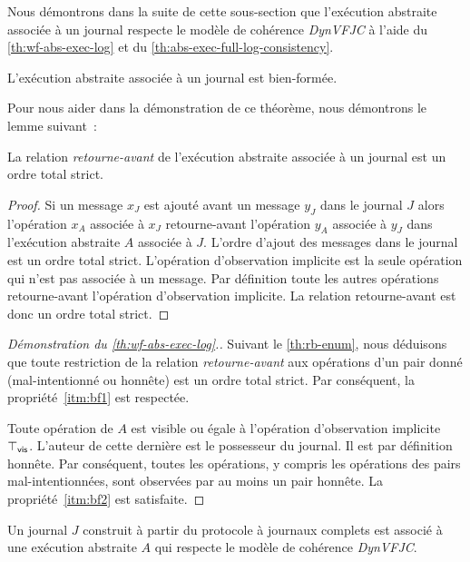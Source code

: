 Nous démontrons dans la suite de cette sous-section que l'exécution abstraite associée à un journal respecte le modèle de cohérence \emph{DynVFJC} à l'aide du \autoref{th:wf-abs-exec-log} et du \autoref{th:abs-exec-full-log-consistency}.

\begin{theorem}\label{th:wf-abs-exec-log}
L'exécution abstraite associée à un journal est bien-formée.
\end{theorem}

Pour nous aider dans la démonstration de ce théorème, nous démontrons le lemme suivant~:

\begin{lemma}\label{th:rb-enum}
La relation \emph{retourne-avant} de l'exécution abstraite associée à un journal est un ordre total strict.
\end{lemma}
\begin{proof}
Si un message $x_J$ est ajouté avant un message $y_J$ dans le journal $J$ alors l'opération $x_A$ associée à $x_J$ retourne-avant l'opération $y_A$ associée à $y_J$ dans l'exécution abstraite $A$ associée à $J$.
L'ordre d'ajout des messages dans le journal est un ordre total strict.
L'opération d'observation implicite est la seule opération qui n'est pas associée à un message.
Par définition toute les autres opérations retourne-avant l'opération d'observation implicite.
La relation retourne-avant est donc un ordre total strict.
\end{proof}

\begin{proof}[Démonstration du \autoref{th:wf-abs-exec-log}.]
Suivant le \autoref{th:rb-enum}, nous déduisons que toute restriction de la relation \emph{retourne-avant} aux opérations d'un pair donné (mal-intentionné ou honnête) est un ordre total strict.
Par conséquent, la propriété~\ref{itm:bf1} est respectée.

Toute opération de $A$ est visible ou égale à l'opération d'observation implicite $\top_{\operatorname{\mathsf{vis}}}$.
L'auteur de cette dernière est le possesseur du journal.
Il est par définition honnête.
Par conséquent, toutes les opérations, y compris les opérations des pairs mal-intentionnées, sont observées par au moins un pair honnête.
La propriété~\ref{itm:bf2} est satisfaite.
\end{proof}


\begin{theorem}\label{th:abs-exec-full-log-consistency}
Un journal $J$ construit à partir du protocole à journaux complets est associé à une exécution abstraite $A$ qui respecte le modèle de cohérence \emph{DynVFJC}.
\end{theorem}

